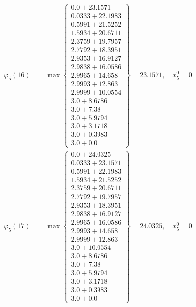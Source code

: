 \documentclass{article}
\begin{document}
\begin{align*}
\varphi_{5}(16) &= \max \left\{ \begin{array}{c}
0.0 + 23.1571 \\
 0.0333 + 22.1983 \\
 0.5991 + 21.5252 \\
 1.5934 + 20.6711 \\
 2.3759 + 19.7957 \\
 2.7792 + 18.3951 \\
 2.9353 + 16.9127 \\
 2.9838 + 16.0586 \\
 2.9965 + 14.658 \\
 2.9993 + 12.863 \\
 2.9999 + 10.0554 \\
 3.0 + 8.6786 \\
 3.0 + 7.38 \\
 3.0 + 5.9794 \\
 3.0 + 3.1718 \\
 3.0 + 0.3983 \\
 3.0 + 0.0
\end{array} \right\}=23.1571, \quad x_{5}^0=0\\
  
\varphi_{5}(17) &= \max \left\{ \begin{array}{c}
0.0 + 24.0325 \\
 0.0333 + 23.1571 \\
 0.5991 + 22.1983 \\
 1.5934 + 21.5252 \\
 2.3759 + 20.6711 \\
 2.7792 + 19.7957 \\
 2.9353 + 18.3951 \\
 2.9838 + 16.9127 \\
 2.9965 + 16.0586 \\
 2.9993 + 14.658 \\
 2.9999 + 12.863 \\
 3.0 + 10.0554 \\
 3.0 + 8.6786 \\
 3.0 + 7.38 \\
 3.0 + 5.9794 \\
 3.0 + 3.1718 \\
 3.0 + 0.3983 \\
 3.0 + 0.0
\end{array} \right\}=24.0325, \quad x_{5}^0=0\\
  

\end{align*}
\end{document}
